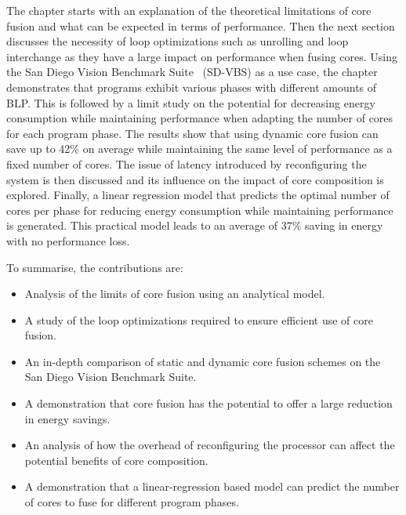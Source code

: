The chapter starts with an explanation of the theoretical limitations of core fusion and what can be expected in terms of performance.
Then the next section discusses the necessity of loop optimizations such as unrolling and loop interchange as they have a large impact on performance when fusing cores.
Using the San Diego Vision Benchmark Suite~\cite{sdvbs} (SD-VBS) as a use case, the chapter demonstrates that programs exhibit various phases with different amounts of BLP.
This is followed by a limit study on the potential for decreasing energy consumption while maintaining performance when adapting the number of cores for each program phase.
The results show that using dynamic core fusion can save up to 42\% on average while maintaining the same level of performance as a fixed number of cores.
The issue of latency introduced by reconfiguring the system is then discussed and its influence on the impact of core composition is explored.
Finally, a linear regression model that predicts the optimal number of cores per phase for reducing energy consumption while maintaining performance is generated.
This practical model leads to an average of 37\% saving in energy with no performance loss.

To summarise, the contributions are:

\begin{itemize}
\item Analysis of the limits of core fusion using an analytical model.
\vspace{-1em}
\item A study of the loop optimizations required to ensure efficient use of core fusion.
\vspace{-2.5em}
\item An in-depth comparison of static and dynamic core fusion schemes on the San Diego Vision Benchmark Suite.
\vspace{-1em}
\item A demonstration that core fusion has the potential to offer a large reduction in energy savings.
\vspace{-1em}
\item An analysis of how the overhead of reconfiguring the processor can affect the potential benefits of core composition.
\vspace{-1em}
\item A demonstration that a linear-regression based model can predict the number of cores to fuse for different program phases.
\end{itemize}


